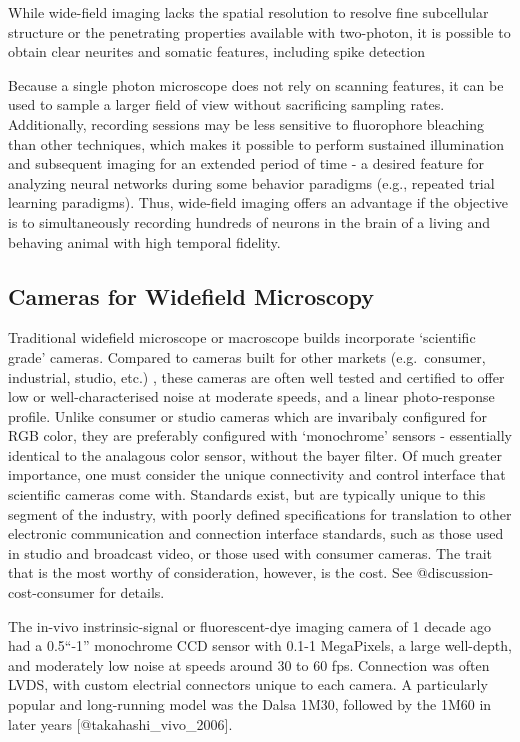 While wide-field imaging lacks the spatial resolution to resolve fine subcellular structure or the penetrating properties available with two-photon, it is possible to obtain clear neurites and somatic features, including spike detection 

Because a single photon microscope does not rely on scanning features, it can be used to sample a larger field of view without sacrificing sampling rates.
Additionally, recording sessions may be less sensitive to fluorophore bleaching than other techniques, which makes it possible to perform sustained illumination and subsequent imaging for an extended period of time - a desired feature for analyzing neural networks during some behavior paradigms (e.g., repeated trial learning paradigms).
Thus, wide-field imaging offers an advantage if the objective is to simultaneously recording hundreds of neurons in the brain of a living and behaving animal with high temporal fidelity.

\subsection{
	Cameras for Widefield Microscopy}\label{cameras-for-widefield-microscopy} 

Traditional widefield microscope or macroscope builds incorporate `scientific grade' cameras.
Compared to cameras built for other markets (e.g.~consumer, industrial, studio, etc.)
, these cameras are often well
tested and certified to offer low or well-characterised noise at
moderate speeds, and a linear photo-response profile.
Unlike consumer or studio cameras which are invaribaly configured for RGB color, they are preferably configured with `monochrome' sensors - essentially identical to the analagous color sensor, without the bayer filter.
Of much greater importance, one must consider the unique connectivity and control interface that scientific cameras come with.
Standards exist, but are typically unique to this segment of the industry, with poorly defined specifications for translation to other electronic communication and connection interface standards, such as those used in studio and broadcast video, or those used with consumer cameras.
The trait that is the most worthy of consideration, however, is the cost.
See @discussion-cost-consumer for details.

The in-vivo instrinsic-signal or fluorescent-dye imaging camera of 1 decade ago had a 0.5``-1'' monochrome CCD sensor with 0.1-1 MegaPixels, a large well-depth, and moderately low noise at speeds around 30 to 60 fps.
Connection was often LVDS, with custom electrial connectors unique to each camera.
A particularly popular and long-running model was the Dalsa 1M30, followed by the 1M60 in later years {[}@takahashi\_vivo\_2006{]}.

